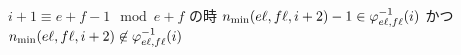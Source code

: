 \begin{lemma}
\label{lm:main_lemma.case_b}
\leanok
$
i + 1 \equiv e + f - 1 \mod e + f
$
の時
$
n_{\mathrm{min}} (e \ell, f \ell, i+2) - 1
\in
\varphi_{e \ell, f \ell}^{-1}(i)
$
かつ
$
n_{\mathrm{min}} (e \ell, f \ell, i+2)
\not \in
\varphi_{e \ell, f \ell}^{-1}(i)
$
\end{lemma}


